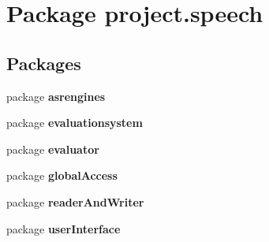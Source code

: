 \section{Package project.\+speech}
\label{namespaceproject_1_1speech}
\subsection*{Packages}
\begin{DoxyCompactItemize}
\item 
package {\bf asrengines}
\item 
package {\bf evaluationsystem}
\item 
package {\bf evaluator}
\item 
package {\bf global\+Access}
\item 
package {\bf reader\+And\+Writer}
\item 
package {\bf user\+Interface}
\end{DoxyCompactItemize}
